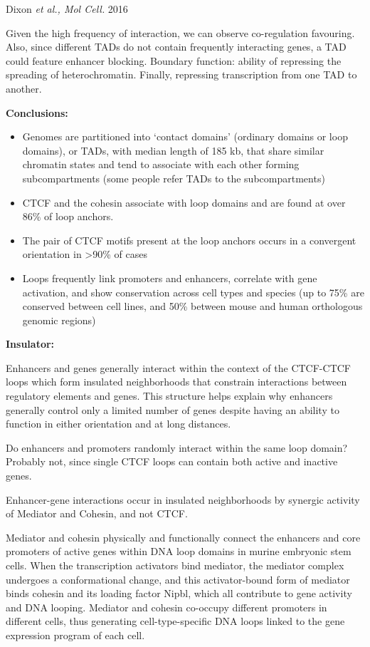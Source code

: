 Dixon \emph{et al., Mol Cell.} 2016

Given the high frequency of interaction, we can observe co-regulation favouring. Also, since different TADs do not contain frequently interacting genes, a TAD could feature enhancer blocking. Boundary function: ability of repressing the spreading of heterochromatin. Finally, repressing transcription from one TAD to another.

\textbf{Conclusions:}

\begin{itemize}
\tightlist
\item
  Genomes are partitioned into `contact domains' (ordinary domains or loop domains), or TADs, with median length of 185 kb, that share similar chromatin states and tend to associate with each other forming subcompartments (some people refer TADs to the subcompartments)
\item
  CTCF and the cohesin associate with loop domains and are found at over 86\% of loop anchors.
\item
  The pair of CTCF motifs present at the loop anchors occurs in a convergent orientation in \textgreater90\% of cases
\item
  Loops frequently link promoters and enhancers, correlate with gene activation, and show conservation across cell types and species (up to 75\% are conserved between cell lines, and 50\% between mouse and human orthologous genomic regions)
\end{itemize}

\textbf{Insulator:}

Enhancers and genes generally interact within the context of the CTCF-CTCF loops which form insulated neighborhoods that constrain interactions between regulatory elements and genes.
This structure helps explain why enhancers generally control only a limited number of genes despite having an ability to function in either orientation and at long distances.

Do enhancers and promoters randomly interact within the same loop domain? Probably not, since single CTCF loops can contain both active and inactive genes.

Enhancer-gene interactions occur in insulated neighborhoods by synergic activity of Mediator and Cohesin, and not CTCF.

Mediator and cohesin physically and functionally connect the enhancers and core
promoters of active genes within DNA loop domains in murine embryonic stem cells. When the transcription activators bind mediator, the mediator complex undergoes a conformational change, and this activator-bound form of mediator binds cohesin and its loading factor Nipbl, which all contribute to gene activity and DNA looping. Mediator and cohesin co-occupy different promoters in different cells, thus generating cell-type-specific DNA loops linked to the gene expression program of each cell.

